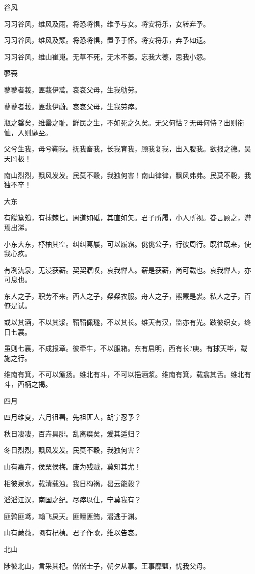 谷风

习习谷风，维风及雨。将恐将惧，维予与女。将安将乐，女转弃予。

习习谷风，维风及颓。将恐将惧，置予于怀。将安将乐，弃予如遗。

习习谷风，维山崔嵬。无草不死，无木不萎。忘我大德，思我小怨。

蓼莪

蓼蓼者莪，匪莪伊蒿。哀哀父母，生我劬劳。

蓼蓼者莪，匪莪伊蔚。哀哀父母，生我劳瘁。

瓶之罄矣，维罍之耻。鲜民之生，不如死之久矣。无父何怙？无母何恃？出则衔恤，入则靡至。

父兮生我，母兮鞠我。抚我畜我，长我育我，顾我复我，出入腹我。欲报之德。昊天罔极！

南山烈烈，飘风发发。民莫不穀，我独何害！南山律律，飘风弗弗。民莫不穀，我独不卒！

大东

有饛簋飧，有捄棘匕。周道如砥，其直如矢。君子所履，小人所视。眷言顾之，潸焉出涕。

小东大东，杼柚其空。纠纠葛屦，可以履霜。佻佻公子，行彼周行。既往既来，使我心疚。

有冽氿泉，无浸获薪。契契寤叹，哀我惮人。薪是获薪，尚可载也。哀我惮人，亦可息也。

东人之子，职劳不来。西人之子，粲粲衣服。舟人之子，熊罴是裘。私人之子，百僚是试。

或以其酒，不以其浆。鞙鞙佩璲，不以其长。维天有汉，监亦有光。跂彼织女，终日七襄。

虽则七襄，不成报章。彼牵牛，不以服箱。东有启明，西有长?庚。有捄天毕，载施之行。

维南有箕，不可以簸扬。维北有斗，不可以挹酒浆。维南有箕，载翕其舌。维北有斗，西柄之揭。

四月

四月维夏，六月徂署。先祖匪人，胡宁忍予？

秋日凄凄，百卉具腓。乱离瘼矣，爰其适归？

冬日烈烈，飘风发发。民莫不穀，我独何害？

山有嘉卉，侯栗侯梅。废为残贼，莫知其尤！

相彼泉水，载清载浊。我日构祸，曷云能穀？

滔滔江汉，南国之纪。尽瘁以仕，宁莫我有？

匪鹑匪鸢，翰飞戾天。匪鳣匪鲔，潜逃于渊。

山有蕨薇，隰有杞桋。君子作歌，维以告哀。

北山

陟彼北山，言采其杞。偕偕士子，朝夕从事。王事靡盬，忧我父母。

